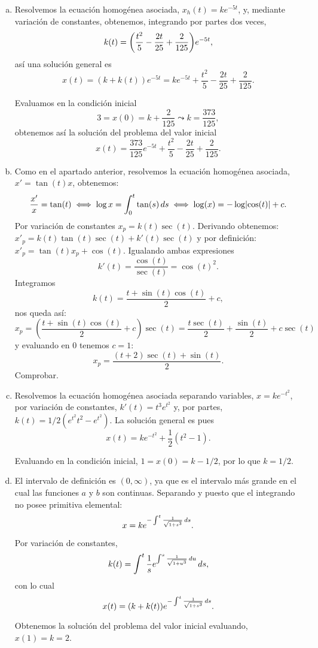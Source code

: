 \documentclass[../ecuaciones_diferenciales.tex]{subfiles}
\begin{document}
\begin{solution}
	\begin{enumerate}[(a), wide, labelwidth=0pt, labelindent=0pt]
		\item Resolvemos la ecuación homogénea asociada, \(x_h(t) = k e^{-5t}\),
		      y, mediante variación de constantes, obtenemos, integrando por
		      partes dos veces,
		      \[k(t) = \parens{\frac{t^2}{5} - \frac{2t}{25}
				      + \frac{2}{125}} e^{-5t},\]
		      así una solución general es
		      \[x(t) = (k + k(t)) e^{-5t}
			      = k e^{-5t} + \frac{t^2}{5} - \frac{2t}{25} + \frac{2}{125}.\]

		      Evaluamos en la condición inicial
		      \[3 = x(0) = k + \frac{2}{125} \leadsto k = \frac{373}{125},\]
		      obtenemos así la solución del problema del valor inicial
		      \[x(t) =  \frac{373}{125} e^{-5t} + \frac{t^2}{5} - \frac{2t}{25}
			      + \frac{2}{125}.\]

		\item Como en el apartado anterior, resolvemos la ecuación homogénea 
			  asociada, \(x' = \tan(t)x\), obtenemos:
			  \[
			  	\frac{x'}{x} = \tan(t) \iff \log x = \int_0^t \tan(s) \dif s
				\iff \log(x) = -\log\abs{\cos(t)} + c.
			  \]
			  Por variación de constantes \(x_p = k(t) \sec(t)\). 
			  Derivando obtenemos: \(x'_p = k(t) \tan(t) \sec(t) + k'(t) \sec(t) \) y 
			  por definición: \(x'_p = \tan(t) x_p + \cos(t)\). Igualando ambas expresiones
			  \[
				k'(t) = \frac{\cos(t)}{\sec(t)} = {\cos(t)}^2.
			  \]
			  Integramos
			  \[
			  	k(t) = \frac{t + \sin(t)\cos(t)}{2} + c,
			  \]
			  nos queda así:
			  \[
			  	x_p = \left( \frac{t + \sin(t)\cos(t)}{2} + c \right) \sec(t)
				 	= \frac{t \sec(t)}{2} + \frac{\sin(t)}{2} + c\sec(t)
			  \]
			  y evaluando en \(0\) tenemos \(c = 1\):
			  \[
			  	x_p = \frac{(t + 2)\sec(t) + \sin(t)}{2}.
			  \]
			  Comprobar.


		\item Resolvemos la ecuación homogénea asociada separando variables,
		      \(x = k e^{-t^2}\), por variación de constantes,
		      \(k'(t) = t^3 e^{t^2}\) y, por partes,
		      \(k(t) = 1/2 (e^{t^2}t^2 - e^{t^2})\). La solución general es pues
		      \[x(t) = k e^{-t^2} + \frac{1}{2}(t^2 - 1).\]

		      Evaluando en la condición inicial, \(1 = x(0) = k - 1/2\), por lo
		      que \(k = 1/2\).

		\item El intervalo de definición es \((0, \infty)\), ya que es el
		      intervalo más grande en el cual las funciones \(a\) y \(b\) son
		      continuas. Separando y puesto que el integrando no posee
		      primitiva elemental:
		      \[x = k e^{-\int^t \frac{1}{\sqrt{1 + s^3}} \mathop{d\!} s}.\]

		      Por variación de constantes,
		      \[k(t) = \int^t \frac{1}{s}
			      e^{\int^s \frac{1}{\sqrt{1 + u^3}} \mathop{d\!} u} \mathop{d\!} s,\]
		      con lo cual
		      \[x(t) = (k + k(t))  e^{-\int^t \frac{1}{\sqrt{1 + s^3}} \mathop{d\!} s}.\]

		      Obtenemos la solución del problema del valor inicial evaluando,
		      \(x(1) = k = 2\).
	\end{enumerate}
\end{solution}
\end{document}
